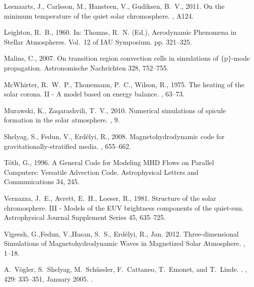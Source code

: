 \documentclass[linenumbers]{aastex63}
\begin{document}
\begin{thebibliography}{}
{Leenaarts}, J., {Carlsson}, M., {Hansteen}, V., {Gudiksen}, B.~V., 2011. {On
  the minimum temperature of the quiet solar chromosphere}. , A124.


{Leighton}, R.~B., 1960. In: {Thomas}, R.~N. (Ed.), Aerodynamic Phenomena in
  Stellar Atmospheres. Vol.~12 of IAU Symposium. pp. 321--325.

{Malins}, C., 2007. {On transition region convection cells in simulations of
  $\{$p$\}$-mode propagation}. Astronomische Nachrichten 328, 752--755.


{McWhirter}, R.~W.~P., {Thonemann}, P.~C., {Wilson}, R., 1975. {The heating of
  the solar corona. II - A model based on energy balance}. , 63--73.

{Murawski}, K., {Zaqarashvili}, T.~V., 2010. {Numerical simulations of spicule
  formation in the solar atmosphere}. , 9.



{Shelyag}, S., {Fedun}, V., {Erd{\'e}lyi}, R., 2008. {Magnetohydrodynamic code
  for gravitationally-stratified media}. , 655--662.

{T{\'o}th}, G., 1996. {A General Code for Modeling {MHD} Flows on Parallel
  Computers: Versatile Advection Code}. Astrophysical Letters and
  Communications 34, 245.

{Vernazza}, J.~E., {Avrett}, E.~H., {Loeser}, R., 1981. {Structure of the solar
  chromosphere. III - Models of the EUV brightness components of the
  quiet-sun}. Astrophysical Journal Supplement Series 45, 635--725.

{Vigeesh}, G.,{Fedun}, V.,{Hasan}, S.~S., {Erd{\'e}lyi}, R.,  Jan. 2012. {Three-dimensional Simulations of Magnetohydrodynamic Waves in Magnetized Solar Atmosphere}. , 1--18.



A.~{V{\"o}gler}, S.~{Shelyag}, M.~{Sch{\"u}ssler}, F.~{Cattaneo}, T.~{Emonet},
  and T.~{Linde}.
.
\newblock \emph{\aap}, 429: 335--351, January 2005.
\newblock {}.





\end{thebibliography}
\end{document}
